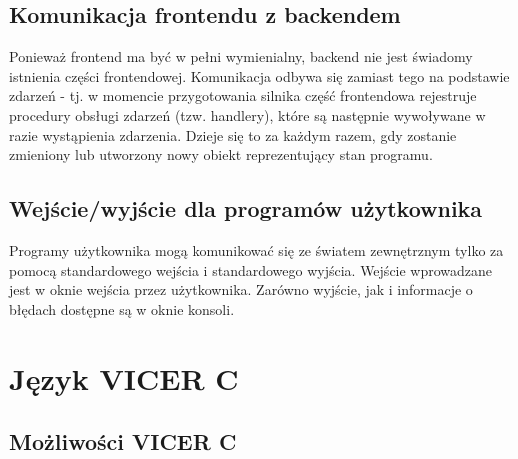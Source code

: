 \documentclass[a4paper,twoside,openright,11pt]{report}
\begin{document}
  \section{Komunikacja frontendu z backendem}
\par Ponieważ frontend ma być w pełni wymienialny, backend nie jest świadomy istnienia części frontendowej. Komunikacja odbywa się zamiast tego na podstawie zdarzeń - tj. w momencie
przygotowania silnika część frontendowa rejestruje procedury obsługi zdarzeń (tzw. handlery), które są następnie wywoływane w razie wystąpienia zdarzenia. Dzieje się to za każdym razem, gdy zostanie zmieniony lub utworzony nowy obiekt reprezentujący stan programu.

  \section {Wejście/wyjście dla programów użytkownika}
  \par Programy użytkownika mogą komunikować się ze światem zewnętrznym tylko za pomocą standardowego wejścia i standardowego wyjścia. Wejście wprowadzane jest w oknie wejścia przez użytkownika. Zarówno wyjście, jak i informacje o błędach dostępne są w oknie konsoli.

  \chapter {Język VICER C}

  \section {Możliwości VICER C}
\end{document}
